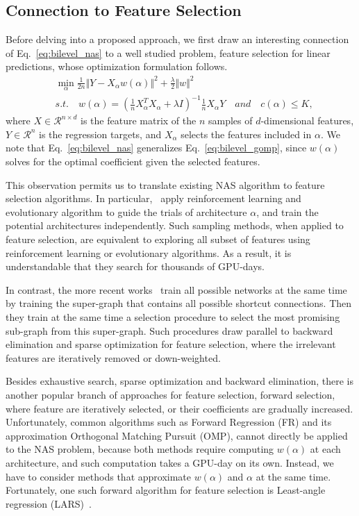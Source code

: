 \subsection{Connection to Feature Selection}

Before delving into a proposed approach, we first draw an interesting connection of Eq.~\ref{eq:bilevel_nas}
to a well studied problem, feature selection for linear predictions, whose optimization formulation follows.
\begin{align}
&\min _{\alpha} \frac{1}{2n} \Vert Y - X_{\alpha} w(\alpha) \Vert ^2 + \frac{\lambda}{2} \Vert w \Vert ^2 \\
&s.t. \quad w(\alpha) = (\frac{1}{n}X_{\alpha}^TX_{\alpha} + \lambda I)^{-1} \frac{1}{n} X_{\alpha}Y 
\quad and \quad c(\alpha) \leq K,
\label{eq:bilevel_gomp}
\end{align}
where $X \in \mathcal{R}^{n \times d}$ is the feature matrix of the $n$ samples of $d$-dimensional features,
$Y \in \mathcal{R}^n$ is the regression targets, and $X_{\alpha}$ selects the features included in $\alpha$.
We note that Eq.~\ref{eq:bilevel_nas} generalizes Eq.~\ref{eq:bilevel_gomp}, since $w(\alpha)$ solves for the 
optimal coefficient given the selected features.

This observation permits us to translate existing NAS algorithm to feature selection algorithms. 
In particular,~\citep{nas,Real2017EvoNet} apply reinforcement learning and evolutionary algorithm to 
guide the trials of architecture $\alpha$, and train the potential architectures independently. 
Such sampling methods, when applied to feature selection, are equivalent to exploring all subset of features 
using reinforcement learning or evolutionary algorithms. As a result, it is understandable that
they search for thousands of GPU-days. 

In contrast, the more recent works~\citep{Pham2018EfficientNA,Liu2018DARTSDA} train all possible
networks at the same time by training the super-graph that contains all possible shortcut connections.
Then they train at the same time a selection procedure to select the most promising 
sub-graph from this super-graph. Such procedures draw parallel to backward elimination 
and sparse optimization for feature selection, 
where the irrelevant features are iteratively removed or down-weighted. 

Besides exhaustive search, sparse optimization and backward elimination, there is another popular branch of approaches 
for feature selection, forward selection, where feature are iteratively selected, or their coefficients are gradually increased. 
Unfortunately, common algorithms such as 
Forward Regression (FR) and its approximation Orthogonal Matching Pursuit (OMP),
cannot 
directly be applied to the NAS problem, because both methods require computing 
$w(\alpha)$ at each architecture, and such computation takes a GPU-day on its own. Instead, we have
to consider methods that approximate $w(\alpha)$ and $\alpha$ at the same time. Fortunately,
one such forward algorithm for feature selection is Least-angle regression (LARS)~\citep{lars}. 

